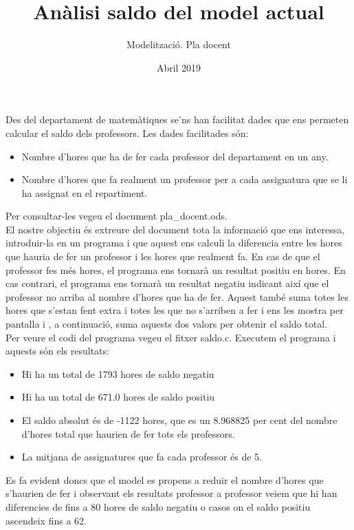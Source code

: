 \documentclass{article}
\title{Anàlisi saldo del model actual}
\author{Modelització. Pla docent}
\date{Abril 2019}
\begin{document}
\maketitle
Des del departament de matemàtiques se'ns han facilitat dades que ens permeten calcular el saldo dels professors. Les dades facilitades són:
\begin{itemize}
    \item Nombre d'hores que ha de fer cada professor del departament en un any.
    \item Nombre d'hores que fa realment un professor per a cada assignatura que se li ha assignat en el repartiment.
\end{itemize}
Per consultar-les vegeu el document pla\_docent.ods.
\\
El nostre objectiu és extreure del document tota la informació que ens interessa, introduir-la  en un programa i que aquest ens calculi la diferencia entre les hores que hauria de fer un professor i les hores que realment fa. En cas de que el professor fes més hores, el programa ens tornarà un resultat positiu en hores. En cas contrari, el programa ens tornarà un resultat negatiu indicant així que el professor no arriba al nombre d'hores que ha de fer. Aquest també suma totes les hores que s'estan fent extra i totes les que no s'arriben a fer i ens les mostra per pantalla i , a continuació, suma aquests dos valors per obtenir el saldo total.
\\
Per veure el codi del programa vegeu el fitxer saldo.c.
Executem el programa i aquests són els resultats:
\begin{itemize}
    \item Hi ha un total de 1793 hores de saldo negatiu
    \item Hi ha un total de 671.0 hores de saldo positiu
    \item El saldo absolut és de -1122 hores, que es un 8.968825 per cent del nombre d'hores total que haurien de fer tots els professors.
    \item La mitjana de assignatures que fa cada professor és de 5.
\end{itemize}
Es fa evident doncs que el model es propens a reduir el nombre d'hores que s'haurien de fer i observant els resultats professor a professor veiem que hi han diferencies de fins a 80 hores de saldo negatiu o casos on el saldo positiu ascendeix fins a 62.
\\
\end{document}
